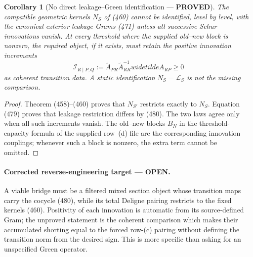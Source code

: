 \documentclass[11pt]{article}
\newtheorem{corollary}[theorem]{Corollary}
\newcommand{\PROVED}{\textcolor{green!45!black}{\textbf{PROVED}}}
\newcommand{\OPEN}{\textcolor{red!70!black}{\textbf{OPEN}}}
\begin{document}
\begin{corollary}[No direct leakage--Green identification --- \PROVED]
The compatible geometric kernels \(N_S\) of (460) cannot be identified,
level by level, with the canonical exterior leakage Grams (471) unless all
successive Schur innovations vanish.  At every threshold where the supplied
old--new block is nonzero, the required object, if it exists, must retain
the positive innovation increments
\begin{equation}
 \mathscr I_{R\mid P,Q}
 :=\widetilde A_{PR}\widetilde A_{RR}^{-1}widetilde A_{RP}\ge0          \tag{480}
\end{equation}
as coherent transition data.  A static identification
\(N_S=\mathscr L_S\) is not the missing comparison.
\end{corollary}

\begin{proof}
Theorem (458)--(460) proves that \(N_{S'}\) restricts exactly to \(N_S\).
Equation (479) proves that leakage restriction differs by (480).  The two
laws agree only when all such increments vanish.  The old--new blocks
\(B_N\) in the threshold-capacity formula of the supplied row~(d) file are
the corresponding innovation couplings; whenever such a block is nonzero,
the extra term cannot be omitted.
\end{proof}

\paragraph{Corrected reverse-engineering target --- \OPEN.}
A viable bridge must be a filtered mixed section object whose transition
maps carry the cocycle (480), while its total Deligne pairing restricts to
the fixed kernels (460).  Positivity of each innovation is automatic from
its source-defined Gram; the unproved statement is the coherent comparison
which makes their accumulated shorting equal to the forced row-(c) pairing
without defining the transition norm from the desired sign.  This is more
specific than asking for an unspecified Green operator.
\end{document}
